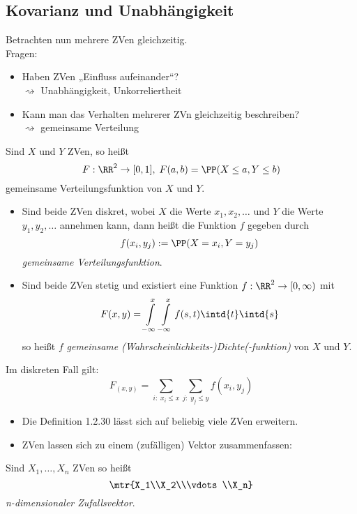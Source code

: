 \documentclass{scrreprt}
\begin{document}
\subsection{Kovarianz und Unabhängigkeit}

Betrachten nun mehrere ZVen gleichzeitig.\\
Fragen:
\begin{itemize}
\item Haben ZVen „Einfluss aufeinander“?\\
$\rightsquigarrow$ Unabhängigkeit, Unkorreliertheit
\item Kann man das Verhalten mehrerer ZVn gleichzeitig beschreiben?\\
$\rightsquigarrow$ gemeinsame Verteilung
\end{itemize}

 Sind $X$ und $Y$ ZVen, so heißt 
$$F: \RR^2 \to [0,1], \; F(a,b) = \PP(X \leq a, Y \leq b)$$
gemeinsame Verteilungsfunktion von $X$ und $Y$.
\begin{itemize}
\item Sind beide ZVen diskret, wobei $X$ die Werte $x_1, x_2, \dots$ und $Y$ die Werte $y_1, y_2, \dots$ annehmen kann, dann heißt die Funktion $f$ gegeben durch 
$$f(x_i, y_j):= \PP(X=x_i, Y=y_j)$$
\emph{gemeinsame Verteilungsfunktion}.
\item Sind beide ZVen stetig und existiert eine Funktion $f: \RR^2 \to [0,\infty)$ mit 
$$F(x,y) = \int\limits_{-\infty}^x\int\limits_{-\infty}^x f(s,t) \intd{t} \intd{s}$$
so heißt $f$ \emph{gemeinsame (Wahrscheinlichkeits-)Dichte(-funktion)} von $X$ und $Y$.
\end{itemize}

 Im diskreten Fall gilt:
$$F_(x,y) = \sum_{i:\; x_i\leq x} \sum_{j:\; y_j \leq y}f(x_i, y_j)$$
\begin{itemize}
\item Die Definition 1.2.30 lässt sich auf beliebig viele ZVen erweitern.
\item ZVen lassen sich zu einem (zufälligen) Vektor zusammenfassen:
\end{itemize}

 Sind $X_1, \dots, X_n$ ZVen so heißt
$$\mtr{X_1\\X_2\\\vdots\\X_n}$$
\emph{n-dimensionaler Zufallsvektor}.
\end{document}
